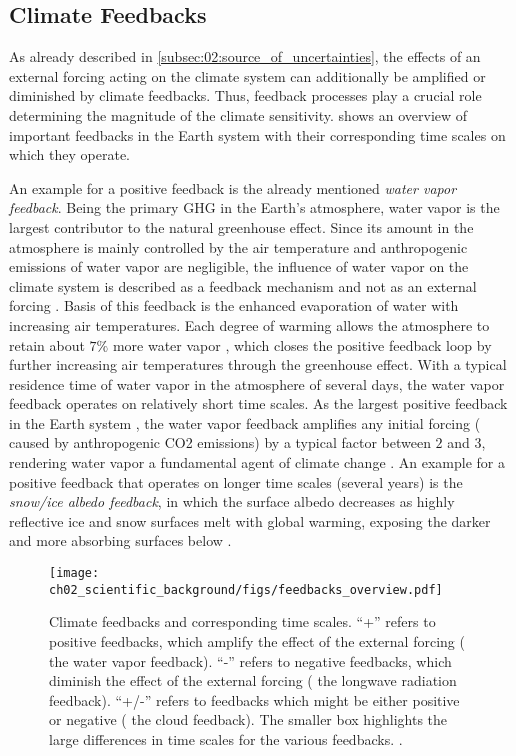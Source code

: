 \subsection{Climate Feedbacks}
\label{subsec:02:climate_feedbacks}

As already described in \cref{subsec:02:source_of_uncertainties}, the effects
of an external forcing acting on the climate system can additionally be
amplified or diminished by climate feedbacks. Thus, feedback processes play a
crucial role determining the magnitude of the climate sensitivity.
 shows an overview of important feedbacks in
the Earth system with their corresponding time scales on which they operate.

An example for a positive feedback is the already mentioned \emph{water vapor
  feedback}. Being the primary \ac{GHG} in the Earth's atmosphere, water vapor
is the largest contributor to the natural greenhouse effect. Since its amount
in the atmosphere is mainly controlled by the air temperature and anthropogenic
emissions of water vapor are negligible, the influence of water vapor on the
climate system is described as a feedback mechanism and not as an external
forcing \autocite{Myhre2013}. Basis of this feedback is the enhanced
evaporation of water with increasing air temperatures. Each degree of warming
allows the atmosphere to retain about $7 \unit{\%}$ more water vapor
\autocite{Myhre2013}, which closes the positive feedback loop by further
increasing air temperatures through the greenhouse effect. With a typical
residence time of water vapor in the atmosphere of several days, the water
vapor feedback operates on relatively short time scales. As the largest
positive feedback in the Earth system \autocite{Soden2006}, the water vapor
feedback amplifies any initial forcing (\eg{} caused by anthropogenic \ac{CO2}
emissions) by a typical factor between $2$ and $3$, rendering water vapor a
fundamental agent of climate change \autocite{Myhre2013}. An example for a
positive feedback that operates on longer time scales (several years) is the
\emph{snow/ice albedo feedback}, in which the surface albedo decreases as
highly reflective ice and snow surfaces melt with global warming, exposing the
darker and more absorbing surfaces below \autocite{Cubasch2013}.

\begin{figure}[!t]
  \centering
  \texttt{[image: 
    ch02\_scientific\_background/figs/feedbacks\_overview.pdf]}
  \caption[
    Climate feedbacks and corresponding time scales.
  ]{
    Climate feedbacks and corresponding time scales. \enquote{+} refers to
    positive feedbacks, which amplify the effect of the external forcing (\eg{}
    the water vapor feedback). \enquote{-} refers to negative feedbacks, which
    diminish the effect of the external forcing (\eg{} the longwave radiation
    feedback). \enquote{+/-} refers to feedbacks which might be either positive
    or negative (\eg{} the cloud feedback). The smaller box highlights the
    large differences in time scales for the various feedbacks.
    .
  }
  \label{fig:02:feedbacks_overview}
\end{figure}


